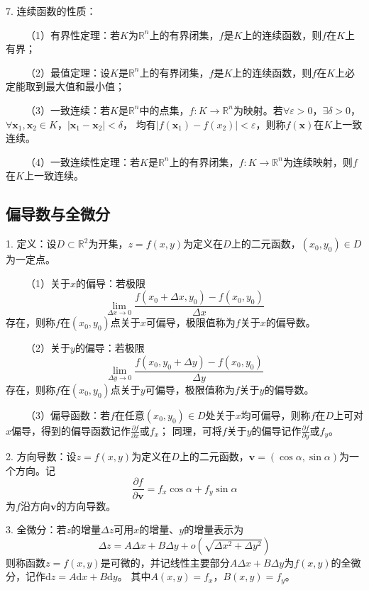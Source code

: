 7. 连续函数的性质：

~~~~（1）有界性定理：若$K$为$\mathbb{R}^n$上的有界闭集，$f$是$K$上的连续函数，则$f$在$K$上有界；

~~~~（2）最值定理：设$K$是$\mathbb{R}^n$上的有界闭集，$f$是$K$上的连续函数，则$f$在$K$上必定能取到最大值和最小值；

~~~~（3）一致连续：若$K$是$\mathbb{R}^n$中的点集，$f:K\rightarrow \mathbb{R}^n$为映射。若$\forall \varepsilon>0$，$\exists \delta >0$，$\forall \mathbf{x}_1,\mathbf{x}_2\in K$，$|\mathbf{x}_1-\mathbf{x}_2|<\delta$，
均有$|f(\mathbf{x}_1)-f(x_2)|<\varepsilon$，则称$f(\mathbf{x})$在$K$上一致连续。

~~~~（4）一致连续性定理：若$K$是$\mathbb{R}^n$上的有界闭集，$f:K\rightarrow \mathbb{R}^n$为连续映射，则$f$在$K$上一致连续。

\subsection{偏导数与全微分}

1. 定义：设$D\subset \mathbb{R}^2$为开集，$z=f(x,y)$为定义在$D$上的二元函数，$\left(x_0,y_0\right)\in D$为一定点。

~~~~（1）关于$x$的偏导：若极限
\begin{equation*}
    \lim\limits_{\Delta x\rightarrow 0}\frac{f(x_0+\Delta x,y_0)-f(x_0,y_0)}{\Delta x}
\end{equation*}
存在，则称$f$在$(x_0,y_0)$点关于$x$可偏导，极限值称为$f$关于$x$的偏导数。

~~~~（2）关于$y$的偏导：若极限
\begin{equation*}
    \lim\limits_{\Delta y\rightarrow 0}\frac{f(x_0,y_0+\Delta y)-f(x_0,y_0)}{\Delta y}
\end{equation*}
存在，则称$f$在$(x_0,y_0)$点关于$y$可偏导，极限值称为$f$关于$y$的偏导数。

~~~~（3）偏导函数：若$f$在任意$(x_0,y_0)\in D$处关于$x$均可偏导，则称$f$在$D$上可对$x$偏导，得到的偏导函数记作$\frac{\partial f }{\partial x}$或$f_x$；
同理，可将$f$关于$y$的偏导记作$\frac{\partial f}{\partial y}$或$f_y$。

2. 方向导数：设$z=f(x,y)$为定义在$D$上的二元函数，$\mathbf{v}=(\cos \alpha,\sin \alpha)$为一个方向。记
\begin{equation*}
    \frac{\partial f}{\partial\mathbf{v}}=f_x \cos\alpha +f_y \sin\alpha
\end{equation*}
为$f$沿方向$\mathbf{v}$的方向导数。

3. 全微分：若$z$的增量$\Delta z$可用$x$的增量、$y$的增量表示为
\begin{equation*}
    \Delta z =A \Delta x +B\Delta y+o\left(\sqrt{\Delta x^2+\Delta y^2}\right)
\end{equation*}
则称函数$z=f(x,y)$是可微的，并记线性主要部分$A\Delta x +B \Delta y$为$f(x,y)$的全微分，记作$\mathrm{d}z=A\mathrm{d}x+B\mathrm{d}y$。
其中$A(x,y)=f_x$，$B(x,y)=f_y$。


